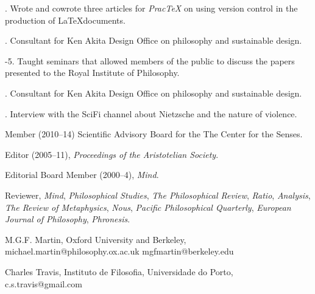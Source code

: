 \documentclass[11pt]{article}
\begin{document}
. Wrote and cowrote three articles for \emph{PracTeX} on using version control in the production of \LaTeX documents.

. Consultant for Ken Akita Design Office on philosophy and sustainable design.

-5. Taught seminars that allowed members of the public to discuss the papers presented to the Royal Institute of Philosophy.

. Consultant for Ken Akita Design Office on philosophy and sustainable design.

. Interview with the SciFi channel about Nietzsche and the nature of violence.

\bigskip

\medskip


\ind Member (2010--14) Scientific Advisory Board for the The Center for the Senses.

\ind Editor (2005--11), \emph{Proceedings of the Aristotelian Society}.

\ind Editorial Board Member (2000--4), \emph{Mind}. 

\ind Reviewer, \emph{Mind}, \emph{Philosophical Studies},
\emph{The Philosophical Review}, \emph{Ratio}, \emph{Analysis}, \emph{The Review of Metaphysics}, \emph{Nous}, \emph{Pacific Philosophical Quarterly}, \emph{European Journal of Philosophy}, \emph{Phronesis}.


\medskip

\ind M.G.F. Martin, Oxford University and Berkeley, michael.martin@philosophy.ox.ac.uk mgfmartin@berkeley.edu

\ind Charles Travis, Instituto de Filosofia, Universidade do Porto, c.s.travis@gmail.com
\end{document}
